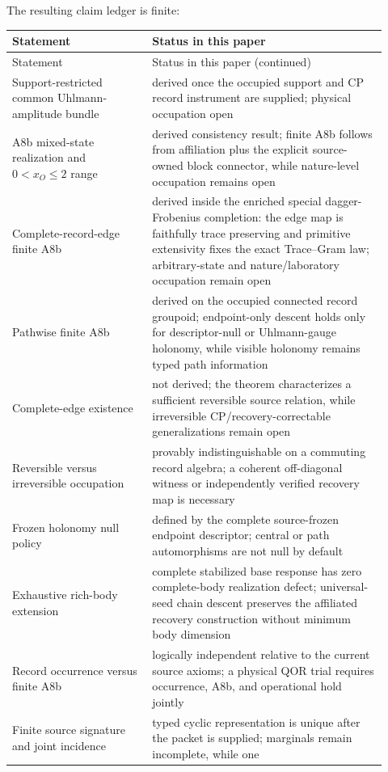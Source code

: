 \documentclass[11pt]{article}
\begin{document}
The resulting claim ledger is finite:
\small
\begin{longtable}{L{0.34\linewidth}L{0.58\linewidth}}
\toprule
Statement & Status in this paper\\
\midrule
\endfirsthead
\toprule
Statement & Status in this paper (continued)\\
\midrule
\endhead
Support-restricted common Uhlmann-amplitude bundle & derived once the occupied
support and CP record instrument are supplied; physical occupation open\\
A8b mixed-state realization and \(0<x_O\leq2\) range & derived consistency
result; finite A8b follows from affiliation plus the explicit source-owned
block connector, while nature-level occupation remains open\\
Complete-record-edge finite A8b & derived inside the enriched special
dagger-Frobenius completion: the edge map is faithfully trace preserving and
primitive extensivity fixes the exact Trace--Gram law; arbitrary-state and
nature/laboratory occupation remain open\\
Pathwise finite A8b & derived on the occupied connected record groupoid;
endpoint-only descent holds only for descriptor-null or Uhlmann-gauge
holonomy, while visible holonomy remains typed path information\\
Complete-edge existence & not derived; the theorem characterizes a sufficient
reversible source relation, while irreversible CP/recovery-correctable
generalizations remain open\\
Reversible versus irreversible occupation & provably indistinguishable on a
commuting record algebra; a coherent off-diagonal witness or independently
verified recovery map is necessary\\
Frozen holonomy null policy & defined by the complete source-frozen endpoint
descriptor; central or path automorphisms are not null by default\\
Exhaustive rich-body extension & complete stabilized base response has zero
complete-body realization defect; universal-seed chain descent preserves the
affiliated recovery construction without minimum body dimension\\
Record occurrence versus finite A8b & logically independent relative to the
current source axioms; a physical QOR trial requires occurrence, A8b, and
operational hold jointly\\
Finite source signature and joint incidence & typed cyclic representation is
unique after the packet is supplied; marginals remain incomplete, while one

\end{longtable}
\end{document}
